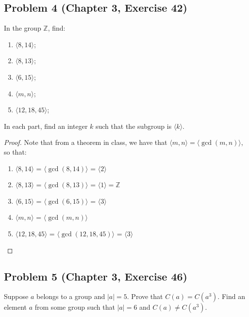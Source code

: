 \documentclass{article}
\begin{document}
\subsection*{Problem 4 (Chapter 3, Exercise 42)}
In the group $\mathbb{Z}$, find:
\begin{enumerate}[label=(\alph*)]
\item $\langle 8, 14 \rangle$;
\item $\langle 8, 13 \rangle$;
\item $\langle 6, 15 \rangle$;
\item $\langle m, n \rangle$;
\item $\langle 12, 18, 45 \rangle$;
\end{enumerate}
In each part, find an integer $k$ such that the subgroup is $\langle k \rangle$.
\begin{proof}

Note that from a theorem in class, we have that $\langle m, n \rangle = \langle \gcd{(m, n)}\rangle$, so that: 

\begin{enumerate}[label=(\alph*)]
\item $\langle 8, 14 \rangle$ = $\langle \gcd{(8, 14)} \rangle$ = $\langle 2 \rangle$
\item $\langle 8, 13 \rangle$ = $\langle \gcd{(8, 13)} \rangle$ = $\langle 1 \rangle = \mathbb{Z}$
\item $\langle 6, 15 \rangle$ = $\langle \gcd{(6, 15)} \rangle$ = $\langle 3 \rangle$
\item $\langle m, n \rangle$ = $\langle \gcd{(m, n)}\rangle$
\item $\langle 12, 18, 45 \rangle$ = $\langle \gcd{(12, 18, 45)}\rangle$ = $\langle 3 \rangle$
\end{enumerate}

\end{proof}


\subsection*{Problem 5 (Chapter 3, Exercise 46)}
Suppose $a$ belongs to a group and $|a| = 5$. Prove that $C(a) = C(a^3)$. Find an element $a$ from some group such that $|a| = 6$ and $C(a) \neq C(a^3)$.
\end{document}
